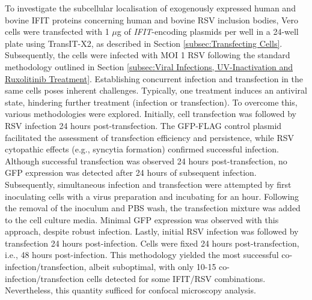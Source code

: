 To investigate the subcellular localisation of exogenously expressed human and bovine IFIT proteins concerning human and bovine RSV inclusion bodies, Vero cells were transfected with 1 \(\mu\)g of \textit{IFIT}-encoding plasmids per well in a 24-well plate using TransIT-X2, as described in Section \ref{subsec:Transfecting Cells}. Subsequently, the cells were infected with MOI 1 RSV following the standard methodology outlined in Section \ref{subsec:Viral Infections, UV-Inactivation and Ruxolitinib Treatment}. Establishing concurrent infection and transfection in the same cells poses inherent challenges. Typically, one treatment induces an antiviral state, hindering further treatment (infection or transfection). To overcome this, various methodologies were explored. Initially, cell transfection was followed by RSV infection 24 hours post-transfection. The GFP-FLAG control plasmid facilitated the assessment of transfection efficiency and persistence, while RSV cytopathic effects (e.g., syncytia formation) confirmed successful infection. Although successful transfection was observed 24 hours post-transfection, no GFP expression was detected after 24 hours of subsequent infection. Subsequently, simultaneous infection and transfection were attempted by first inoculating cells with a virus preparation and incubating for an hour. Following the removal of the inoculum and PBS wash, the transfection mixture was added to the cell culture media. Minimal GFP expression was observed with this approach, despite robust infection. Lastly, initial RSV infection was followed by transfection 24 hours post-infection. Cells were fixed 24 hours post-transfection, i.e., 48 hours post-infection. This methodology yielded the most successful co-infection/transfection, albeit suboptimal, with only 10-15 co-infection/transfection cells detected for some IFIT/RSV combinations. Nevertheless, this quantity sufficed for confocal microscopy analysis.

